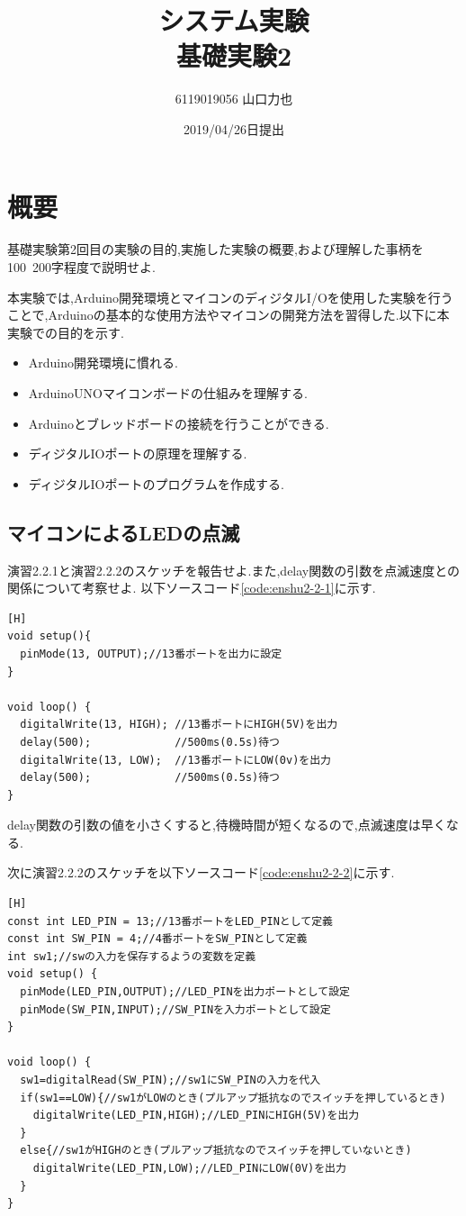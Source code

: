 \documentclass{jarticle}
\title{{システム実験}\\基礎実験2}
\author{6119019056 山口力也}
\date{2019/04/26日提出}
\begin{document}
\maketitle

\section{概要}
基礎実験第2回目の実験の目的,実施した実験の概要,および理解した事柄を100~200字程度で説明せよ.

本実験では,Arduino開発環境とマイコンのディジタルI/Oを使用した実験を行うことで,Arduinoの基本的な使用方法やマイコンの開発方法を習得した.以下に本実験での目的を示す.

\begin{itemize}

\item Arduino開発環境に慣れる.
\item ArduinoUNOマイコンボードの仕組みを理解する.
\item Arduinoとブレッドボードの接続を行うことができる.
\item ディジタルIOポートの原理を理解する.
\item ディジタルIOポートのプログラムを作成する.

\end{itemize}

\subsection{マイコンによるLEDの点滅}
演習2.2.1と演習2.2.2のスケッチを報告せよ.また,delay関数の引数を点滅速度との関係について考察せよ.
以下ソースコード\ref{code:enshu2-2-1}に示す.

\begin{lstlisting}[caption = 演習2.2.1,label=code:enshu2-2-1][H]
void setup(){
  pinMode(13, OUTPUT);//13番ポートを出力に設定
}

void loop() {
  digitalWrite(13, HIGH); //13番ポートにHIGH(5V)を出力 
  delay(500);             //500ms(0.5s)待つ
  digitalWrite(13, LOW);  //13番ポートにLOW(0v)を出力 
  delay(500);             //500ms(0.5s)待つ 
}
\end{lstlisting}

delay関数の引数の値を小さくすると,待機時間が短くなるので,点滅速度は早くなる.

次に演習2.2.2のスケッチを以下ソースコード\ref{code:enshu2-2-2}に示す.

\begin{lstlisting}[caption = 演習2.2.2,label=code:enshu2-2-2][H]
const int LED_PIN = 13;//13番ポートをLED_PINとして定義
const int SW_PIN = 4;//4番ポートをSW_PINとして定義
int sw1;//swの入力を保存するようの変数を定義
void setup() {
  pinMode(LED_PIN,OUTPUT);//LED_PINを出力ポートとして設定
  pinMode(SW_PIN,INPUT);//SW_PINを入力ポートとして設定
}

void loop() {
  sw1=digitalRead(SW_PIN);//sw1にSW_PINの入力を代入
  if(sw1==LOW){//sw1がLOWのとき(プルアップ抵抗なのでスイッチを押しているとき)
    digitalWrite(LED_PIN,HIGH);//LED_PINにHIGH(5V)を出力
  }
  else{//sw1がHIGHのとき(プルアップ抵抗なのでスイッチを押していないとき)
    digitalWrite(LED_PIN,LOW);//LED_PINにLOW(0V)を出力
  }
}
\end{lstlisting}
\end{document}
